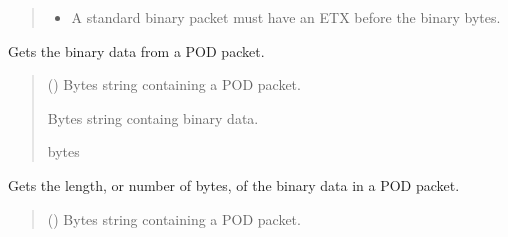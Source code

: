 \documentclass[letterpaper,10pt,english]{sphinxmanual}
\begin{document}
\begin{fulllineitems}
\begin{fulllineitems}
\begin{quote}
\begin{description}
\begin{itemize}
\item {} 
\sphinxAtStartPar
{} \textendash{} A standard binary packet must have an ETX before the binary bytes.

\end{itemize}

\end{description}\end{quote}

\end{fulllineitems}


\begin{fulllineitems}
\label{\detokenize{PodApi.Packets:PodApi.Packets.Binary.PacketBinary.GetBinaryData}}
\pysigstartsignatures
{}
\pysigstopsignatures
\sphinxAtStartPar
Gets the binary data from a POD packet.
\begin{quote}\begin{description}
\sphinxAtStartPar
{} () \textendash{} Bytes string containing a POD packet.

\sphinxAtStartPar
Bytes string containg binary data.

\sphinxAtStartPar
bytes

\end{description}\end{quote}

\end{fulllineitems}


\begin{fulllineitems}
\label{\detokenize{PodApi.Packets:PodApi.Packets.Binary.PacketBinary.GetBinaryLength}}
\pysigstartsignatures
{}
\pysigstopsignatures
\sphinxAtStartPar
Gets the length, or number of bytes, of the binary data in a POD packet.
\begin{quote}\begin{description}
\sphinxAtStartPar
{} () \textendash{} Bytes string containing a POD packet.


\end{description}
\end{quote}
\end{fulllineitems}
\end{fulllineitems}
\end{document}
